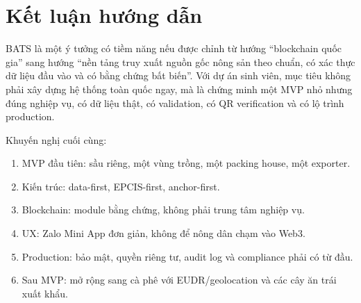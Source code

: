 \documentclass[12pt,a4paper]{article}
\begin{document}
\section{Kết luận hướng dẫn}

BATS là một ý tưởng có tiềm năng nếu được chỉnh từ hướng ``blockchain quốc gia'' sang hướng ``nền tảng truy xuất nguồn gốc nông sản theo chuẩn, có xác thực dữ liệu đầu vào và có bằng chứng bất biến''. Với dự án sinh viên, mục tiêu không phải xây dựng hệ thống toàn quốc ngay, mà là chứng minh một MVP nhỏ nhưng đúng nghiệp vụ, có dữ liệu thật, có validation, có QR verification và có lộ trình production.

Khuyến nghị cuối cùng:

\begin{enumerate}[leftmargin=2em]
    \item MVP đầu tiên: sầu riêng, một vùng trồng, một packing house, một exporter.
    \item Kiến trúc: data-first, EPCIS-first, anchor-first.
    \item Blockchain: module bằng chứng, không phải trung tâm nghiệp vụ.
    \item UX: Zalo Mini App đơn giản, không để nông dân chạm vào Web3.
    \item Production: bảo mật, quyền riêng tư, audit log và compliance phải có từ đầu.
    \item Sau MVP: mở rộng sang cà phê với EUDR/geolocation và các cây ăn trái xuất khẩu.
\end{enumerate}
\end{document}
